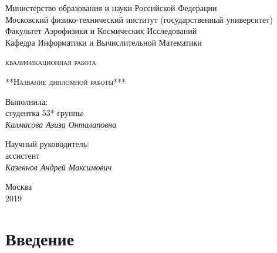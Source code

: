 \documentclass[a4paper,12pt]{article}
\numberwithin{equation}{section}%
\begin{document}
\begin{titlepage}
	\centering
	{Министерство образования и науки Российской Федерации\\
	Московский физико-технический институт (государственный университет)
	\\Факультет Аэрофизики и Космических Исследований
	\\Кафедра Информатики и Вычислительной Математики\par}
	\vspace{4 cm}
	{\scshape{} квалификационная работа \par}
	\vspace{2 cm}
	{\scshape\Large***Название дипломной работы***\par}
	\vfill
	\raggedleft
	{Выполнила:\\
	студентка 53* группы\\
	\itshape Калмасова Азиза Онталаповна\par}
	{Научный руководитель:\\
	ассистент\\
	\itshape Казеннов Андрей Максимович\par}
	\vfill
	\centering
	{\large Москва\\
	2019\par}
\end{titlepage}

\tableofcontents

\newpage
\section{Введение}
\end{document}
